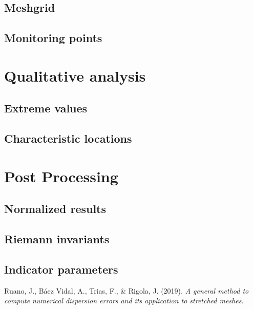 \subsection{Meshgrid}\label{meshgrid}

\subsection{Monitoring points}\label{monitoring-points}

\section{Qualitative analysis}\label{qualitative-analysis}

\subsection{Extreme values}\label{extreme-values}

\subsection{Characteristic locations}\label{characteristic-locations}

\section{Post Processing}\label{post-processing}

\subsection{Normalized results}\label{normalized-results}

\subsection{Riemann invariants}\label{riemann-invariants}

\subsection*{Indicator parameters}\label{indicator-parameters}

\hypertarget{refs}{}
\hypertarget{ref-Ruano2019}{}
Ruano, J., Báez Vidal, A., Trias, F., \& Rigola, J. (2019). \emph{A
general method to compute numerical dispersion errors and its
application to stretched meshes}.
